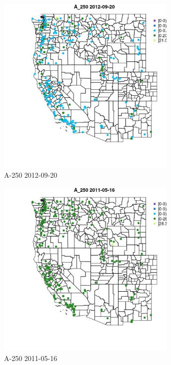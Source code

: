 \begin{figure} 
\centering  
\includegraphics[width=0.77\textwidth]{Code_Outputs/ML_input_report_ML_input_PM25_Step5_part_d_de_duplicated_aves_ML_input_MapObsA_2502012-09-20.jpg} 
\caption{\label{fig:ML_input_report_ML_input_PM25_Step5_part_d_de_duplicated_aves_ML_inputMapObsA_2502012-09-20}A-250 2012-09-20} 
\end{figure} 
 

\begin{figure} 
\centering  
\includegraphics[width=0.77\textwidth]{Code_Outputs/ML_input_report_ML_input_PM25_Step5_part_d_de_duplicated_aves_ML_input_MapObsA_2502011-05-16.jpg} 
\caption{\label{fig:ML_input_report_ML_input_PM25_Step5_part_d_de_duplicated_aves_ML_inputMapObsA_2502011-05-16}A-250 2011-05-16} 
\end{figure} 
 

